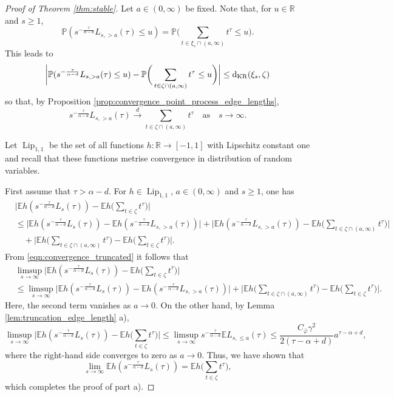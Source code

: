 \documentclass{article}
\theoremstyle{definition}
\numberwithin{equation}{section}
\theoremstyle{remark}
\begin{document}
\begin{proof}[Proof of Theorem \ref{thm:stable}]
Let $a\in(0,\infty)$ be fixed. Note that, for $u\in\mathbb{R}$ and $s\geq 1$,
$$
\mathbb{P}( s^{-\frac{\tau}{\alpha-d}} L_{s,>a}(\tau) \leq u ) = \mathbb{P}\bigg( \sum_{t\in\xi_s\cap (a,\infty)} t^{\tau} \leq u\bigg).
$$
This leads to
$$
\bigg| \mathbb{P}( s^{-\frac{\tau}{\alpha-d}} L_{s,>a}(\tau) \leq u ) - \mathbb{P}\bigg( \sum_{t\in\zeta\cap(a,\infty)} t^{\tau} \leq u \bigg) \bigg| \leq {\rm d}_{\rm KR}(\xi_s,\zeta)
$$
so that, by Proposition \ref{prop:convergence_point_process_edge_lengths},
\begin{equation}\label{eqn:convergence_truncated}
s^{-\frac{\tau}{\alpha-d}} L_{s,>a}(\tau) \overset{d}{\longrightarrow} \sum_{t\in\zeta\cap(a,\infty)} t^{\tau} \quad \text{as} \quad s\to\infty.
\end{equation}

Let $\operatorname{Lip}_{1,1}$ be the set of all functions $h:\mathbb{R}\to[-1,1]$ with Lipschitz constant one and recall that these functions metrise convergence in distribution of random variables.

First assume that $\tau>\alpha-d$. For $h\in\operatorname{Lip}_{1,1}$, $a\in(0,\infty)$ and $s\geq 1$, one has
\begin{align*}
& \bigg| \mathbb{E}h(s^{-\frac{\tau}{\alpha-d}}L_s(\tau)) - \mathbb{E}h\bigg(\sum_{t\in\zeta} t^\tau\bigg) \bigg| \\
& \leq \big| \mathbb{E}h(s^{-\frac{\tau}{\alpha-d}}L_s(\tau)) - \mathbb{E}h(s^{-\frac{\tau}{\alpha-d}}L_{s,>a}(\tau)) \big| + \bigg| \mathbb{E}h(s^{-\frac{\tau}{\alpha-d}}L_{s,>a}(\tau)) - \mathbb{E}h\bigg(\sum_{t\in\zeta\cap (a,\infty)} t^\tau\bigg) \bigg| \\
& \quad + \bigg|\mathbb{E}h\bigg(\sum_{t\in\zeta\cap (a,\infty)} t^\tau\bigg) -  \mathbb{E}h\bigg(\sum_{t\in\zeta} t^\tau\bigg) \bigg|.
\end{align*}
From \eqref{eqn:convergence_truncated} it follows that
\begin{align*}
& \limsup_{s\to\infty} \bigg| \mathbb{E}h(s^{-\frac{\tau}{\alpha-d}}L_s(\tau)) - \mathbb{E}h\bigg(\sum_{t\in\zeta} t^\tau\bigg) \bigg| \\
& \leq \limsup_{s\to\infty} \big| \mathbb{E}h(s^{-\frac{\tau}{\alpha-d}}L_s(\tau)) - \mathbb{E}h(s^{-\frac{\tau}{\alpha-d}}L_{s,> a}(\tau)) \big| + \bigg|\mathbb{E}h\bigg(\sum_{t\in\zeta\cap (a,\infty)} t^\tau\bigg) -  \mathbb{E}h\bigg(\sum_{t\in\zeta} t^\tau\bigg) \bigg|.
\end{align*}
Here, the second term vanishes as $a\to0$. On the other hand, by Lemma \ref{lem:truncation_edge_length} a),
$$
\limsup_{s\to\infty} \bigg| \mathbb{E}h(s^{-\frac{\tau}{\alpha-d}}L_s(\tau)) - \mathbb{E}h\bigg(\sum_{t\in\zeta} t^\tau\bigg) \bigg| \leq \limsup_{s\to\infty} s^{-\frac{\tau}{\alpha-d}} \mathbb{E}L_{s,\leq a}(\tau)\leq \frac{C_{\bar{\varphi}}\gamma^2 }{2(\tau-\alpha+d)} a^{\tau-\alpha+d}, 
$$
where the right-hand side converges to zero as $a\to0$. Thus, we have shown that
$$
\lim_{s\to\infty} \mathbb{E}h(s^{-\frac{\tau}{\alpha-d}}L_s(\tau)) = \mathbb{E}h\bigg(\sum_{t\in\zeta} t^\tau\bigg),
$$
which completes the proof of part a).


\end{proof}
\end{document}
